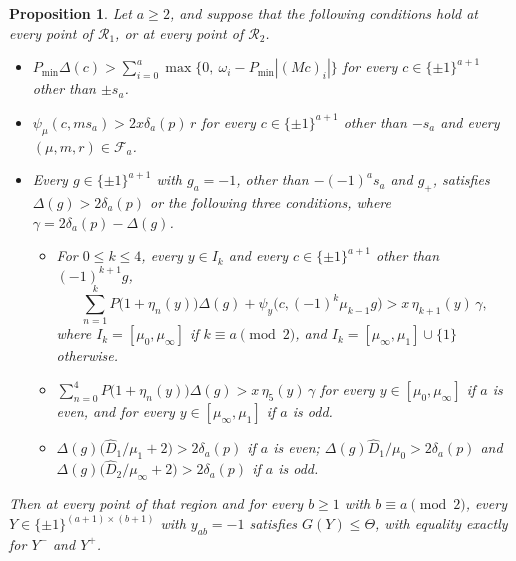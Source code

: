 \documentclass[11pt]{article}
\newtheorem{proposition}[theorem]{Proposition}
\theoremstyle{remark}
\begin{document}
\begin{proposition}\label{prop:reduction}
Let $a\ge2$, and suppose that the following conditions hold at every point
of $\mathcal R_1$, or at every point of $\mathcal R_2$.
\begin{itemize}
\item[(S$_a$)] $P_{\min}\Delta(c)>\sum_{i=0}^a
 \max\{0,\ \omega_i-P_{\min}|(Mc)_i|\}$ for every $c\in\{\pm1\}^{a+1}$
 other than $\pm s_a$.
\item[(F$_a$)] $\psi_\mu(c,ms_a)>2x\delta_a(p)\,r$ for every
 $c\in\{\pm1\}^{a+1}$ other than $-s_a$ and every $(\mu,m,r)\in\mathcal F_a$.
\item[(C$_a$)] Every $g\in\{\pm1\}^{a+1}$ with $g_a=-1$, other than
 $-(-1)^as_a$ and $g_+$, satisfies $\Delta(g)>2\delta_a(p)$ or the following
 three conditions, where $\gamma=2\delta_a(p)-\Delta(g)$.
 \begin{itemize}
 \item[(C1)] For $0\le k\le4$, every $y\in I_k$ and every
 $c\in\{\pm1\}^{a+1}$ other than $(-1)^{k+1}g$,
 \[
 \sum_{n=1}^{k}P\bigl(1+\eta_n(y)\bigr)\Delta(g)
 +\psi_y\bigl(c,(-1)^k\mu_{k-1}g\bigr)>x\,\eta_{k+1}(y)\,\gamma,
 \]
 where $I_k=[\mu_0,\mu_\infty]$ if $k\equiv a\pmod2$, and
 $I_k=[\mu_\infty,\mu_1]\cup\{1\}$ otherwise.
 \item[(C2)] $\sum_{n=0}^{4}P\bigl(1+\eta_n(y)\bigr)\Delta(g)
 >x\,\eta_5(y)\,\gamma$ for every $y\in[\mu_0,\mu_\infty]$ if $a$ is even,
 and for every $y\in[\mu_\infty,\mu_1]$ if $a$ is odd.
 \item[(C3)] $\Delta(g)\bigl(\hat D_1/\mu_1+2\bigr)>2\delta_a(p)$ if $a$ is
 even; $\Delta(g)\hat D_1/\mu_0>2\delta_a(p)$ and
 $\Delta(g)\bigl(\hat D_2/\mu_\infty+2\bigr)>2\delta_a(p)$ if $a$ is odd.
 \end{itemize}
\end{itemize}
Then at every point of that region and for every $b\ge1$ with
$b\equiv a\pmod2$, every $Y\in\{\pm1\}^{(a+1)\times(b+1)}$ with $y_{ab}=-1$
satisfies $G(Y)\le\Theta$, with equality exactly for $Y^-$ and $Y^+$.
\end{proposition}
\end{document}
